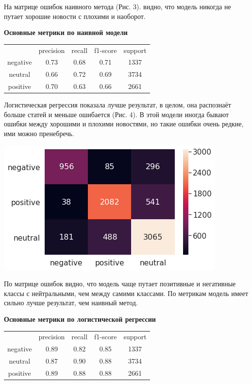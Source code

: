 \documentclass[12pt]{article}
\begin{document}
        На матрице ошибок наивного метода (Рис. 3). видно, что модель никогда не путает хорошие новости
        с плохими и наоборот.

        \textbf{Основные метрики по наивной модели}
        \begin{center}
            \begin{tabular}{ c c c c c}
             & precision & recall & f1-score & support\\ 
             negative & 0.73 & 0.68 & 0.71 & 1337\\ 
             neutral & 0.66 & 0.72 & 0.69 & 3734\\
             positive & 0.70 & 0.63 & 0.66 & 2661
            \end{tabular}
        \end{center}

        Логистическая регрессия показала лучше результат, в целом, она распознаёт больше
        статей и меньше ошибается (Рис. 4). В этой модели иногда бывают ошибки между хорошими и плохими 
        новостями, но такие ошибки очень редкие, ими можно пренебречь.

        \begin{center}
            \includegraphics[scale=0.8]{logreg_heat}
        \end{center}

        По матрице ошибок видно, что модель чаще путает позитивные и негативные классы с нейтральными, 
        чем между самими классами. По метрикам модель имеет сильно лучше результат, чем наивный метод.
        
        \textbf{Основные метрики по логистической регрессии}
        \begin{center}
            \begin{tabular}{ c c c c c}
             & precision & recall & f1-score & support\\ 
             negative & 0.89 & 0.82 & 0.85 & 1337\\ 
             neutral & 0.87 & 0.90 & 0.88 & 3734\\
             positive & 0.89 & 0.88 & 0.88 & 2661
            \end{tabular}
        \end{center}
\end{document}
